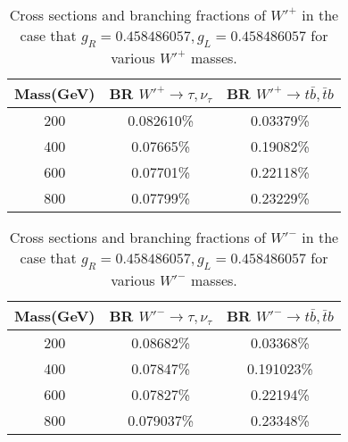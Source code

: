  
 
 \begin{table}[htb]
	\centering
\begin{tabular}{|c|c|c|}
\hline 
Mass(GeV)  &  BR $ W'^+\rightarrow \tau,\nu_\tau $& BR $ W'^+\rightarrow  t \bar{b},\bar{t}b $ \\
\hline 
200 & 0.082610\% & 0.03379\%\\
400 &0.07665\%& 0.19082\%\\
600 &0.07701\%&0.22118\%\\
800&0.07799\% &0.23229\%\\

\hline
\end{tabular}
\caption{Cross sections and branching fractions of $W'^+$ in the case that $ g_R=0.458486057 , g_L=0.458486057  $ for various $W'^+$ masses. \label{tab: W' positive} }
\end{table}


 \begin{table}[htb]
	\centering
\begin{tabular}{|c|c|c|}
\hline 
Mass(GeV)  &  BR $ W'^-\rightarrow \tau,\nu_\tau $ & BR $ W'^-\rightarrow  t \bar{b},\bar{t}b $ \\
\hline 
200 &  0.08682\% &0.03368\% \\
400  &0.07847\% &0.191023\% \\
600  &0.07827\%&0.22194\%\\
800  &0.079037\% &0.23348\% \\

\hline
\end{tabular}
\caption{Cross sections and branching fractions of $W'^-$ in the case that $ g_R=0.458486057 , g_L=0.458486057  $ for various $W'^-$ masses. \label{tab1} }
\end{table}






